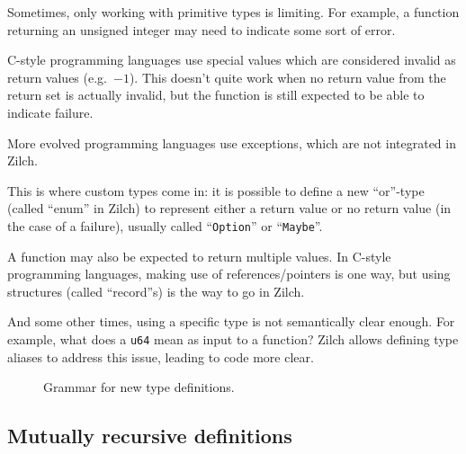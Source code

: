 Sometimes, only working with primitive types is limiting.
For example, a function returning an unsigned integer may need to indicate some sort of error.

\noindent C-style programming languages use special values which are considered invalid as return values (e.g.\ $-1$).
This doesn't quite work when no return value from the return set is actually invalid, but the function is still expected to be able to indicate failure.

\noindent More evolved programming languages use exceptions, which are not integrated in Zilch.

\noindent This is where custom types come in: it is possible to define a new ``or''-type (called ``enum'' in Zilch) to represent either a return value or no return value (in the case of a failure), usually called ``\texttt{Option}'' or ``\texttt{Maybe}''.

A function may also be expected to return multiple values.
In C-style programming languages, making use of references/pointers is one way, but using structures (called ``record''s) is the way to go in Zilch.

And some other times, using a specific type is not semantically clear enough.
For example, what does a \texttt{u64} mean as input to a function?
Zilch allows defining type aliases to address this issue, leading to code more clear.

\begin{figure}[H]
	\centering


	\caption{Grammar for new type definitions.}
	\label{fig:zilch-grammar-declarations-type-grammar}
\end{figure}

\subsection{Mutually recursive definitions}\label{subsec:zilch-grammar-declarations-mutual}

